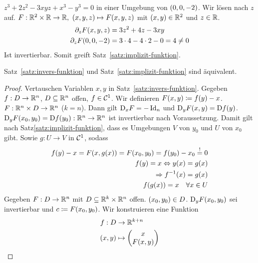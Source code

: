 \begin{beispiel}
    $z^3 + 2z^2 - 3xyz + x^3 - y^3 = 0$ in einer Umgebung von $\left(0,0,-2\right)$. Wir lösen nach $z$ auf. $F: \R^2\times\R\to\R,~\pair{x,y,z}\mapsto F\of{x,y,z}$ mit $\left(x,y\right)\in\mathbb{R}^2$ und $z\in\mathbb{R}$.
    \begin{align*}
        \partial_z F\of{x,y,z} &= 3z^2 + 4z - 3xy\\
        \partial_z F\of{0,0,-2} &= 3\cdot 4 - 4\cdot 2 - 0 = 4\neq 0
    \end{align*}
    Ist invertierbar. Somit greift Satz~\ref{satz:implizit-funktion}.
\end{beispiel}

\begin{satz} %
    Satz~\ref{satz:invers-funktion} und Satz~\ref{satz:implizit-funktion} sind äquivalent.
    \begin{proof}
        \anf{$\impl$} Vertauschen Variablen $x,y$ in Satz~\ref{satz:invers-funktion}. Gegeben $f: D\rightarrow{}\mathbb{R}^n$, $D\subseteq\mathbb{R}^n$ offen, $f\in\mathcal{C}^{1}$. Wir definieren $F\of{x,y} \coloneqq f\of{y}-x$. $F:\mathbb{R}^n\times D\to\mathbb{R}^n$ ($k=n$). Dann gilt $\text{D}_x F = -\operatorname{Id}_{n}$ und $\text{D}_y F\of{x,y} = \D f\of{y}$.\\
        $\text{D}_y F\of{x_0, y_0} = \D f\of{y_0}: \R^n\fromto \R^n$ ist invertierbar nach Voraussetzung. Damit gilt nach Satz\ref{satz:implizit-funktion}, dass es Umgebungen $V$ von $y_0$ und $U$ von $x_0$ gibt. Sowie $g: U\to V$ in $\mathcal{C}^1$, sodass
        \begin{align*}
            f\of{y} - x = F\of{x,g\of{x}} = F\of{x_0, y_0} = f\of{y_0} - x_0 \annot{=}{!} 0\\
            f\of{y} = x \equivalent y\of{x} = g\of{x}\\
            \impl f^{-1}\of{x} = g\of{x}\\
            f\of{g\of{x}} = x\quad\forall x\in U
        \end{align*}
        \anf{$\Leftarrow$} Gegeben $F: D\rightarrow{}\mathbb{R}^n$ mit $D\subseteq\mathbb{R}^k\times\mathbb{R}^n$ offen. $\left(x_0, y_0\right)\in D$. $\text{D}_y F\of{x_0, y_0}$ sei invertierbar und $c\coloneqq F\of{x_0, y_0}$. Wir konstruieren eine Funktion
        \begin{align*}
            f: D&\to\R^{k+n}\\
            \pair{x,y}&\mapsto \begin{pmatrix}
                                   x \\
                                   F\of{x,y}
            \end{pmatrix}

\end{align*}
\end{proof}
\end{satz}
